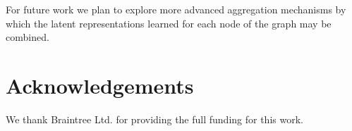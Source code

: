 \documentclass{article}
\theoremstyle{definition}
\begin{document}
For future work we plan to explore more advanced aggregation mechanisms by which the latent representations learned for each node of the graph may be combined.

\section*{Acknowledgements}
We thank Braintree Ltd. for providing the full funding for this work.

\appendix
\cleardoublepage


\end{document}
